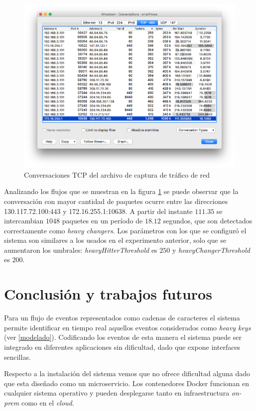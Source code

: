 \documentclass[a4paper,10pt, oneside]{article}
\begin{document}
\begin{figure}[h!]
	\centering
	\includegraphics[width=.9\textwidth]{graph/smallFlows_conversations.png}
	\caption{Conversaciones TCP del archivo de captura de tráfico de red}
	\label{fig:smallFlows_conversation}
	
\end{figure}

Analizando los flujos que se muestran en la figura \ref{fig:smallFlows_conversation} se puede observar que la conversación con mayor cantidad de paquetes ocurre entre las direcciones 130.117.72.100:443 y 172.16.255.1:10638. A partir del instante $111.35$ se intercambian $1048$ paquetes en un período de $18.12$ segundos, que son detectados correctamente como \textit{heavy changers}. Los parámetros con los que se configuró el sistema son similares a los usados en el experimento anterior, solo que se aumentaron los umbrales: \textit{heavyHitterThreshold} es $250$ y \textit{heavyChangerThreshold} es $200$.


\section{Conclusión y trabajos futuros}
Para un flujo de eventos representados como cadenas de caracteres el sistema permite identificar en tiempo real aquellos eventos considerados como \textit{heavy keys} (ver \ref{modelado}). Codificando los eventos de esta manera el sistema puede ser integrado en diferentes aplicaciones sin dificultad, dado que expone interfaces sencillas.

Respecto a la instalación del sistema vemos que no ofrece dificultad alguna dado que esta diseñado como un microservicio. Los contenedores Docker funcionan en cualquier sistema operativo y pueden desplegarse tanto en infraestructura \textit{on-prem} como en el \textit{cloud}.
\end{document}
